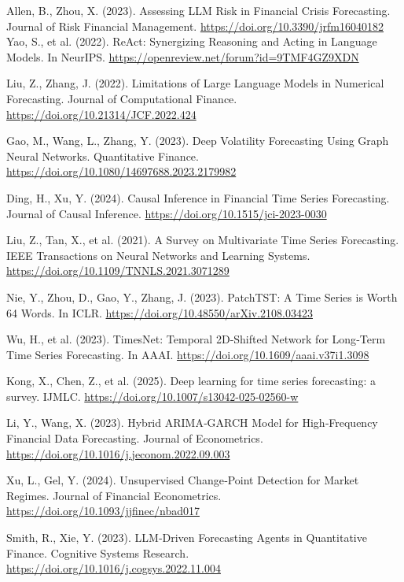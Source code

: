 \documentclass[conference]{IEEEtran}
\begin{document}
\begin{thebibliography}{99}
 Allen, B., Zhou, X. (2023). Assessing LLM Risk in Financial Crisis Forecasting. Journal of Risk Financial Management. \url{https://doi.org/10.3390/jrfm16040182}
 Yao, S., et al. (2022). ReAct: Synergizing Reasoning and Acting in Language Models. In NeurIPS. \url{https://openreview.net/forum?id=9TMF4GZ9XDN}

 Liu, Z., Zhang, J. (2022). Limitations of Large Language Models in Numerical Forecasting. Journal of Computational Finance. \url{https://doi.org/10.21314/JCF.2022.424}

 Gao, M., Wang, L., Zhang, Y. (2023). Deep Volatility Forecasting Using Graph Neural Networks. Quantitative Finance. \url{https://doi.org/10.1080/14697688.2023.2179982}

 Ding, H., Xu, Y. (2024). Causal Inference in Financial Time Series Forecasting. Journal of Causal Inference. \url{https://doi.org/10.1515/jci-2023-0030}

 Liu, Z., Tan, X., et al. (2021). A Survey on Multivariate Time Series Forecasting. IEEE Transactions on Neural Networks and Learning Systems. \url{https://doi.org/10.1109/TNNLS.2021.3071289}



 Nie, Y., Zhou, D., Gao, Y., Zhang, J. (2023). PatchTST: A Time Series is Worth 64 Words. In ICLR. \url{https://doi.org/10.48550/arXiv.2108.03423}

 Wu, H., et al. (2023). TimesNet: Temporal 2D‑Shifted Network for Long‑Term Time Series Forecasting. In AAAI. \url{https://doi.org/10.1609/aaai.v37i1.3098}

 Kong, X., Chen, Z., et al. (2025). Deep learning for time series forecasting: a survey. IJMLC. \url{https://doi.org/10.1007/s13042-025-02560-w}

 Li, Y., Wang, X. (2023). Hybrid ARIMA‑GARCH Model for High‑Frequency Financial Data Forecasting. Journal of Econometrics. \url{https://doi.org/10.1016/j.jeconom.2022.09.003}

 Xu, L., Gel, Y. (2024). Unsupervised Change‑Point Detection for Market Regimes. Journal of Financial Econometrics. \url{https://doi.org/10.1093/jjfinec/nbad017}

 Smith, R., Xie, Y. (2023). LLM‑Driven Forecasting Agents in Quantitative Finance. Cognitive Systems Research. \url{https://doi.org/10.1016/j.cogsys.2022.11.004}


\end{thebibliography}
\end{document}
